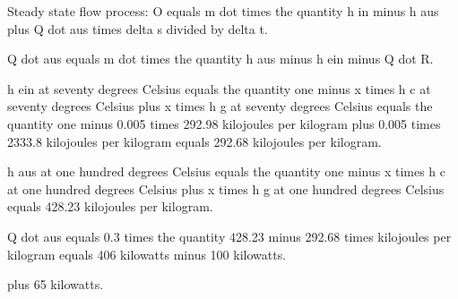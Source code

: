 Steady state flow process: O equals m dot times the quantity h in minus h aus plus Q dot aus times delta s divided by delta t.

Q dot aus equals m dot times the quantity h aus minus h ein minus Q dot R.

h ein at seventy degrees Celsius equals the quantity one minus x times h c at seventy degrees Celsius plus x times h g at seventy degrees Celsius equals the quantity one minus 0.005 times 292.98 kilojoules per kilogram plus 0.005 times 2333.8 kilojoules per kilogram equals 292.68 kilojoules per kilogram.

h aus at one hundred degrees Celsius equals the quantity one minus x times h c at one hundred degrees Celsius plus x times h g at one hundred degrees Celsius equals 428.23 kilojoules per kilogram.

Q dot aus equals 0.3 times the quantity 428.23 minus 292.68 times kilojoules per kilogram equals 406 kilowatts minus 100 kilowatts.

plus 65 kilowatts.